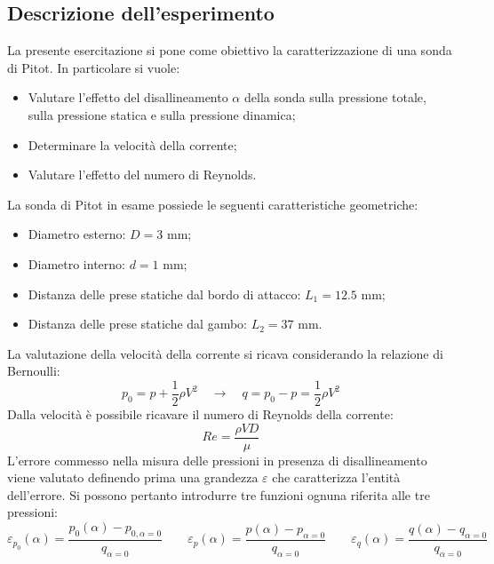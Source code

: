 \subsection{Descrizione dell'esperimento}
La presente esercitazione si pone come obiettivo la caratterizzazione di una sonda di Pitot. In particolare si vuole:
\begin{itemize}
    \item Valutare l'effetto del disallineamento $\alpha$ della sonda sulla pressione totale, sulla pressione statica e sulla pressione dinamica;
    \item Determinare la velocità della corrente;
    \item Valutare l'effetto del numero di Reynolds.
\end{itemize}
\noindent La sonda di Pitot in esame possiede le seguenti caratteristiche geometriche:
\begin{itemize}
    \item Diametro esterno: $D = 3$ mm;
    \item Diametro interno: $d = 1$ mm;
    \item Distanza delle prese statiche dal bordo di attacco: $L_1 = 12.5$ mm;
    \item Distanza delle prese statiche dal gambo: $L_2 = 37$ mm.
\end{itemize}
\newpage
\noindent La valutazione della velocità della corrente si ricava considerando la relazione di Bernoulli:
\begin{equation*}
    p_0 = p + \frac12 \rho V^2 \quad \rightarrow \quad q = p_0 - p = \frac12 \rho V^2
\end{equation*}
Dalla velocità è possibile ricavare il numero di Reynolds della corrente:
\begin{equation*}
    Re = \frac{\rho V D}{\mu}
\end{equation*}
L'errore commesso nella misura delle pressioni in presenza di disallineamento viene valutato definendo prima una grandezza $\varepsilon$ che caratterizza l'entità dell'errore. Si possono pertanto introdurre tre funzioni ognuna riferita alle tre pressioni:
\begin{equation*}
    \varepsilon_{p_0}(\alpha) = \frac{p_0(\alpha) - p_{0,\alpha=0}}{q_{\alpha=0}} \qquad \varepsilon_{p}(\alpha) = \frac{p(\alpha) - p_{\alpha=0}}{q_{\alpha=0}} \qquad \varepsilon_{q}(\alpha) = \frac{q(\alpha) - q_{\alpha=0}}{q_{\alpha=0}}
\end{equation*}


